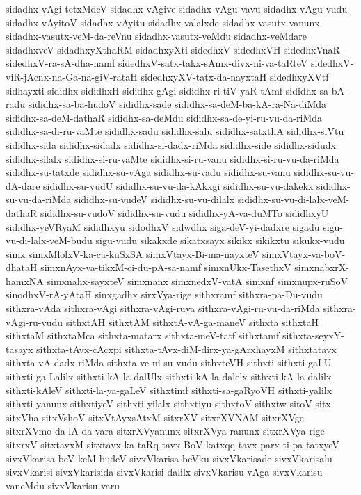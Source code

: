 {sidadhx-vAgi-tetxMdeV
sidadhx-vAgive
sidadhx-vAgu-vavu
sidadhx-vAgu-vudu
sidadhx-vAyitoV
sidadhx-vAyitu
sidadhx-valalxde
sidadhx-vasutx-vanunx
sidadhx-vasutx-veM-da-reVnu
sidadhx-vasutx-veMdu
sidadhx-veMdare
sidadhxveV
sidadhxyXthaRM
sidadhxyXti
sidedhxV
sidedhxVH
sidedhxVnaR
sidedhxV-ra-sA-dha-namf
sidedhxV-satx-takx-sAmx-divx-ni-va-taRteV
sidedhxV-viR-jAcnx-na-Ga-na-giV-rataH
sidedhxyXV-tatx-da-nayxtaH
sidedhxyXVtf
sidhayxti
sididhx
sididhxH
sididhx-gAgi
sididhx-ri-tiV-yaR-tAmf
sididhx-sa-bA-radu
sididhx-sa-ba-hudoV
sididhx-sade
sididhx-sa-deM-ba-kA-ra-Na-diMda
sididhx-sa-deM-dathaR
sididhx-sa-deMdu
sididhx-sa-de-yi-ru-vu-da-riMda
sididhx-sa-di-ru-vaMte
sididhx-sadu
sididhx-salu
sididhx-satxthA
sididhx-siVtu
sididhx-sida
sididhx-sidadx
sididhx-si-dadx-riMda
sididhx-side
sididhx-sidudx
sididhx-silalx
sididhx-si-ru-vaMte
sididhx-si-ru-vanu
sididhx-si-ru-vu-da-riMda
sididhx-su-tatxde
sididhx-su-vAga
sididhx-su-vadu
sididhx-su-vanu
sididhx-su-vu-dA-dare
sididhx-su-vudU
sididhx-su-vu-da-kAkxgi
sididhx-su-vu-dakekx
sididhx-su-vu-da-riMda
sididhx-su-vudeV
sididhx-su-vu-dilalx
sididhx-su-vu-di-lalx-veM-dathaR
sididhx-su-vudoV
sididhx-su-vudu
sididhx-yA-va-duMTo
sididhxyU
sididhx-yeVRyaM
sididhxyu
sidodhxV
sidwdhx
siga-deV-yi-dadxre
sigadu
sigu-vu-di-lalx-veM-budu
sigu-vudu
sikakxde
sikatxsayx
sikikx
sikikxtu
sikukx-vudu
simx
simxMlolxV-ka-ca-kuSxSA
simxVtayx-Bi-ma-nayxteV
simxVtayx-va-boV-dhataH
simxnAyx-va-tikxM-ci-du-pA-sa-namf
simxnUkx-TasethxV
simxnabxrX-hamxNA
simxnahx-sayxteV
simxnanx
simxnedxV-vatA
simxnf
simxnupx-ruSoV
sinodhxV-rA-yAtaH
sinxgadhx
sirxVya-rige
sithxramf
sithxra-pa-Du-vudu
sithxra-vAda
sithxra-vAgi
sithxra-vAgi-ruva
sithxra-vAgi-ru-vu-da-riMda
sithxra-vAgi-ru-vudu
sithxtAH
sithxtAM
sithxtA-vA-ga-maneV
sithxta
sithxtaH
sithxtaM
sithxtaMca
sithxta-matarx
sithxta-meV-tatf
sithxtamf
sithxta-seyxY-tasayx
sithxta-tAvx-cAcxpi
sithxta-tAvx-diM-dirx-ya-gArxhayxM
sithxtatavx
sithxta-vA-dadx-riMda
sithxta-ve-ni-su-vudu
sithxteVH
sithxti
sithxti-gaLU
sithxti-ga-Lalilx
sithxti-kA-la-dalUlx
sithxti-kA-la-dalelx
sithxti-kA-la-dalilx
sithxti-kAleV
sithxti-la-ya-gaLeV
sithxtimf
sithxti-sa-gaRyoVH
sithxti-yalilx
sithxti-yanunx
sithxtiyeV
sithxti-yilalx
sithxtiyu
sithxtoV
sithxtw
sitoV
sitx
sitxVha
sitxVshoV
sitxVtAyxsAtxM
sitxrXV
sitxrXVNAM
sitxrXVge
sitxrXVmo-da-lA-da-vara
sitxrXVyanunx
sitxrXVya-ranunx
sitxrXVya-rige
sitxrxV
sitxtavxM
sitxtavx-ka-taRq-tavx-BoV-katxqq-tavx-parx-ti-pa-tatxyeV
sivxVkarisa-beV-keM-budeV
sivxVkarisa-beVku
sivxVkarisade
sivxVkarisalu
sivxVkarisi
sivxVkarisida
sivxVkarisi-dalilx
sivxVkarisu-vAga
sivxVkarisu-vaneMdu
sivxVkarisu-varu
}
